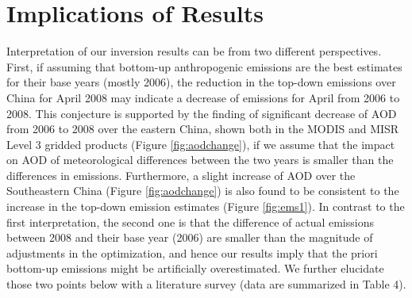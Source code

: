 \section{Implications of Results}

  Interpretation of our inversion results can be from two different perspectives. 
First, if assuming that bottom-up anthropogenic emissions are the best estimates for their base years (mostly 2006), 
the reduction in the top-down emissions over China for April 2008 may indicate a decrease of emissions for April from 2006 to 2008. 
This conjecture is supported by the finding of significant decrease of AOD from 2006 to 2008 over the eastern China, 
shown both in the MODIS and MISR Level 3 gridded products (Figure \ref{fig:aodchange}),
if we assume that the impact on AOD of meteorological differences between the two years is smaller than the differences in emissions.
Furthermore, a slight increase of AOD over the Southeastern China (Figure \ref{fig:aodchange}) 
is also found to be consistent to the increase in the top-down emission estimates (Figure \ref{fig:ems1}). 
In contrast to the first interpretation, the second one is that the difference of actual emissions between 2008 and their base year (2006)
are smaller than the magnitude of adjustments in the optimization, 
and hence our results imply that the priori bottom-up emissions might be artificially overestimated. 
We further elucidate those two points below with a literature survey (data are summarized in Table 4).

